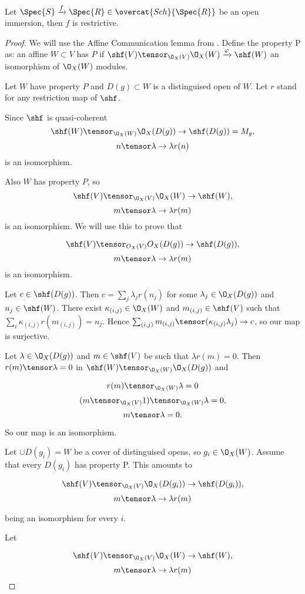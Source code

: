 \begin{lemma}
Let $\Spec{S} \xrightarrow{f} \Spec{R} \in \overcat{Sch}{\Spec{R}}$
be an open immersion, then $f$ is restrictive.
\end{lemma}

\begin{proof}
We will use the Affine Communication lemma from \cite{vakil}.
Define the property P as:
an affine $W\subset V$ has $P$ if $\shf(V)\tensor_{\O_X(V)} \O_X(W) \xrightarrow{\varphi} \shf(W)$ an isomorphism of $\O_X(W)$ modules.

Let $W$ have property $P$ and $D(g)\subset W$ is a distinguised open of $W$.
Let $r$ stand for any restriction map of $\shf$.

Since $\shf$ is quasi-coherent
\[\shf(W)\tensor_{\O_X(W)} \O_X(D(g)) \rightarrow \shf(D(g))= M_g,\]
\[ n \tensor \lambda \to \lambda r(n)\]
is an isomorphism.

Also $W$ has property $P$, so 
\[\shf(V)\tensor_{\O_X(V)} \O_X(W) \rightarrow \shf(W),\]
\[ m \tensor \lambda \to \lambda r(m)\]
is an isomorphism.
We will use this to prove that 

\[\shf(V)\tensor_{O_X(V)} O_X(D(g)) \rightarrow \shf(D(g)),\]
\[m \tensor \lambda \to \lambda r(m)\]
is an isomorphism.

Let $c \in \shf(D(g))$. 
Then $c= \sum_j \lambda_j r(n_j)$ for some $\lambda_j\in \O_X(D(g))$ and $n_j\in\shf(W)$.
There exist $\kappa_{(i,j)} \in \O_X(W)$ and $m_{(i,j)}\in \shf(V)$ such that $\sum_i \kappa_{(i,j)} r(m_{(i,j)})= n_j$.
Hence $\sum_{(i,j)} m_{(i,j)} \tensor (\kappa_{(i,j)}\lambda_j)\to c$, so our map is surjective.

Let $\lambda\in \O_X(D(g))$ and $m\in \shf(V)$ be such that $\lambda r(m)=0$.
Then $r(m) \tensor \lambda = 0$ in $\shf(W)\tensor_{\O_X(W)} \O_X(D(g))$ and

\[ r(m) \tensor_{\O_X(W)} \lambda = 0\]
\[(m\tensor_{\O_X(V)} 1) \tensor_{\O_X(W)} \lambda = 0,\]
\[ m\tensor \lambda = 0 .\]

So our map is an isomorphism.

Let $\cup D(g_i) = W$ be a cover of distinguised opens, so $g_i\in \O_X(W)$.
Assume that every $D(g_i)$ has property P.
This amounts to

\[\shf(V)\tensor_{\O_X(V)} \O_X(D(g_i)) \rightarrow \shf(D(g_i)),\]
\[m \tensor \lambda \to \lambda r(m)\]

being an isomorphism for every $i$.

Let 

\[\shf(V)\tensor_{\O_X(V)} \O_X(W) \rightarrow \shf(W),\]
\[m \tensor \lambda \to \lambda r(m)\]


\end{proof}
